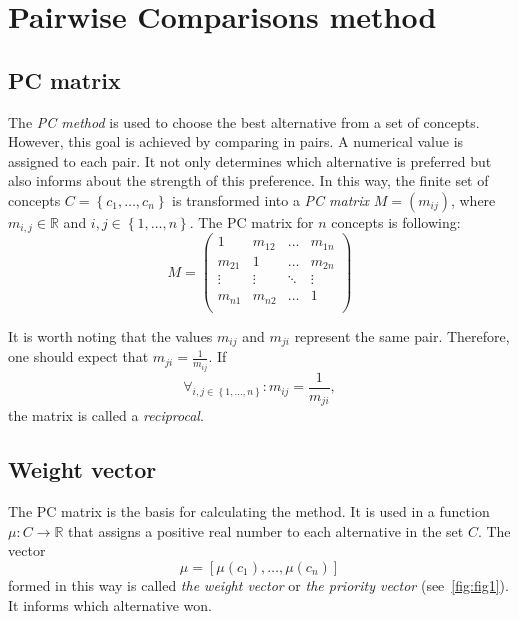 \chapter{Pairwise Comparisons method}
\label{sec:pcMethod}
  \section{PC matrix}
	\label{subsec:macierzPC}
	
	The \textit{PC method} is used to choose the best alternative from a set of concepts. However, this goal is achieved by comparing in pairs. A numerical value is assigned to each pair. It not only determines which alternative is preferred but also informs about the strength of this preference. In this way, the finite set of concepts $C=\left\{ c_{1},\ldots,c_{n}\right\} $ is transformed into a \textit{PC matrix} $M=\left(m_{ij}\right)$, where $m_{i,j}\in \mathbb{R}$ and $i,j\in\left\{ 1,\ldots,n\right\}$. The PC matrix for $n$ concepts is following:
$$
M = 
\left(
\begin{array}{lllll}
	1 & m_{12} & \dots & m_{1n}\\
	m_{21} & 1 & \dots & m_{2n}\\
	\vdots & \vdots & \ddots & \vdots\\
	m_{n1} & m_{n2} & \dots & 1\\ 	
\end{array}
\right)
$$

	It is worth noting that the values $m_{ij}$ and $m_{ji}$ represent the same pair. Therefore, one should expect that $m_{ji}=\frac{1}{m_{ij}}$. If
	\begin{equation} 
		\forall _{i,j\in\left\{ 1,\ldots,n\right\}} :m_{ij}=\frac{1}{m_{ji}},
	\end{equation}
		the matrix is called a \textit{reciprocal}.

  \section{Weight vector}
	\label{subsec:wektorWag}
	
	The PC matrix is the basis for calculating the method. It is used in a function $\mu:C\rightarrow \mathbb{R}$ that assigns a positive real number to each alternative in the set $C$. The vector $$\mu=\left[\mu\left(c_{1}\right),\ldots,\mu\left(c_{n}\right)\right]$$ formed in this way is called \textit{the weight vector} or \textit{the priority vector} (see~\ref{fig:fig1}). It informs which alternative won.

